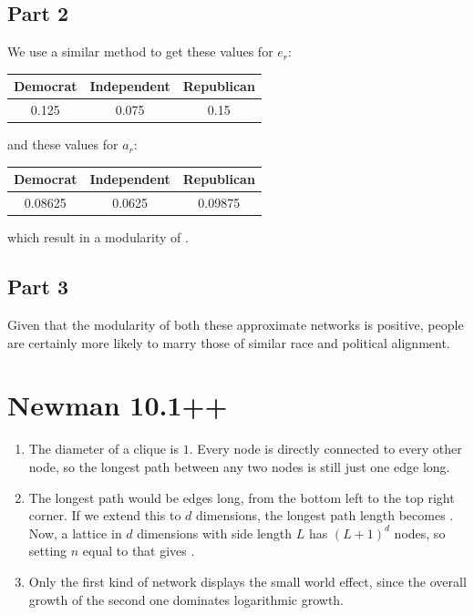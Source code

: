\documentclass[12pt]{article}
\begin{document}
\subsection{Part 2}

We use a similar method to get these values for $e_r$:
\begin{center}
      \begin{tabular}{|ccc|}
            \hline
            Democrat & Independent & Republican \\
            \hline
            0.125    & 0.075       & 0.15       \\
            \hline
      \end{tabular}
\end{center}
and these values for $a_r$:
\begin{center}
      \begin{tabular}{|ccc|}
            \hline
            Democrat & Independent & Republican \\
            \hline
            0.08625  & 0.0625      & 0.09875    \\
            \hline
      \end{tabular}
\end{center}
which result in a modularity of .

\subsection{Part 3}

Given that the modularity of both these approximate networks is positive,
people are certainly more likely to marry those of similar race and political
alignment.

\section{Newman 10.1++}

\begin{enumerate}
      \item The diameter of a clique is $1$.
            Every node is directly connected to every other node,
            so the longest path between any two nodes is still just one edge long.

      \item The longest path would be  edges long, from the bottom left
            to the top right corner.
            If we extend this to $d$ dimensions, the longest path length becomes .
            Now, a lattice in $d$ dimensions with side length $L$ has $(L+1)^d$ nodes,
            so setting $n$ equal to that gives .

      \item Only the first kind of network displays the small world effect,
            since the overall growth of the second one dominates logarithmic growth.
\end{enumerate}
\end{document}
